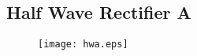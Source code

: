\subsection{Half Wave Rectifier A}
\begin{figure}[H]
  \begin{center}
    \texttt{[image: hwa.eps]}
\end{center}
\end{figure}